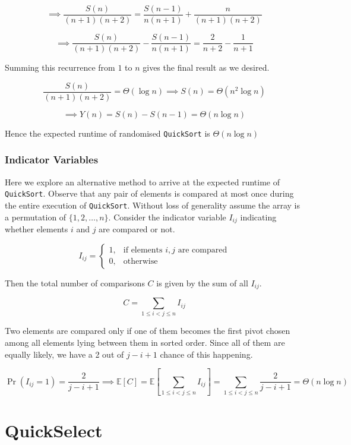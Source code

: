 \[
\implies
\frac{S(n)}{(n+1)(n+2)}
=
\frac{S(n-1)}{n(n+1)}
+
\frac{n}{(n+1)(n+2)}
\]

\[
\implies
\frac{S(n)}{(n+1)(n+2)}
-
\frac{S(n-1)}{n(n+1)}
=
\frac{2}{n+2}-\frac{1}{n+1}
\]

\vspace{0.5em}
Summing this recurrence from $1$ to $n$ gives the final result as we desired.

\[
\frac{S(n)}{(n+1)(n+2)}
=
\Theta(\log n)
\implies
S(n)=\Theta(n^2\log n)
\]

\[
\implies
Y(n)
=
S(n)-S(n-1)
=
\Theta(n\log n)
\]

Hence the expected runtime of randomised \texttt{QuickSort} is $\Theta(n\log n)$

\subsubsection*{Indicator Variables}

\noindent Here we explore an alternative method to arrive at the expected runtime of \texttt{QuickSort}. 
Observe that any pair of elements is compared at most once during the entire execution of \texttt{QuickSort}.
Without loss of generality assume the array is a permutation of $\{1,2,\dots,n\}$.
\noindent Consider the indicator variable $I_{ij}$ indicating whether elements $i$ and $j$ are compared or not.

\[
I_{ij}=
\begin{cases}
1,&\text{if elements }i,j\text{ are compared}\\
0,&\text{otherwise}
\end{cases}
\]

\vspace{0.5em}
\noindent Then the total number of comparisons $C$ is given by the sum of all $I_{ij}$.

\[
C=\sum_{1\le i<j\le n}I_{ij}
\]

Two elements are compared only if one of them becomes the first pivot chosen 
among all elements lying between them in sorted order. Since all of them are equally likely, 
we have a 2 out of \(j-i+1\) chance of this happening.

\[
\Pr(I_{ij}=1)=\frac{2}{j-i+1}
\implies
\mathbb{E}[C]
=
\mathbb{E}[\sum_{1\le i<j\le n}I_{ij}]
=
\sum_{1\le i<j\le n}\frac{2}{j-i+1}
=
\Theta(n\log n)
\]

\section{QuickSelect}

